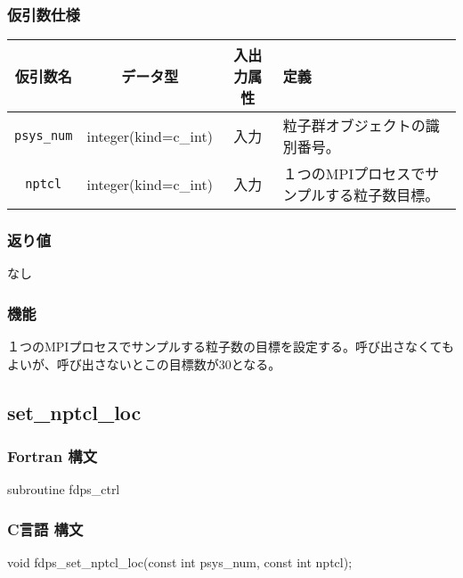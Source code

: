 \subsubsection*{仮引数仕様}
\begin{table}[h]
\begin{tabularx}{\linewidth}{cccX}
\toprule
\rowcolor{Snow2}
仮引数名 & データ型 & 入出力属性 & 定義 \\
\midrule
\texttt{psys\_num} & integer(kind=c\_int) & 入力 & 粒子群オブジェクトの識別番号。\\
\texttt{nptcl} & integer(kind=c\_int) & 入力 & １つのMPIプロセスでサンプルする粒子数目標。\\
\bottomrule
\end{tabularx}
\end{table}

\subsubsection*{返り値}
なし

\subsubsection*{機能}
１つのMPIプロセスでサンプルする粒子数の目標を設定する。呼び出さなくてもよいが、呼び出さないとこの目標数が30となる。

\clearpage

\subsection{set\_nptcl\_loc}
\subsubsection*{Fortran 構文}
\begin{screen}
\begin{spverbatim}
subroutine fdps_ctrl%
\end{spverbatim}
\end{screen}

\subsubsection*{C言語 構文}
\begin{screen}
\begin{spverbatim}
void fdps_set_nptcl_loc(const int psys_num,
                        const int nptcl);
\end{spverbatim}
\end{screen}

